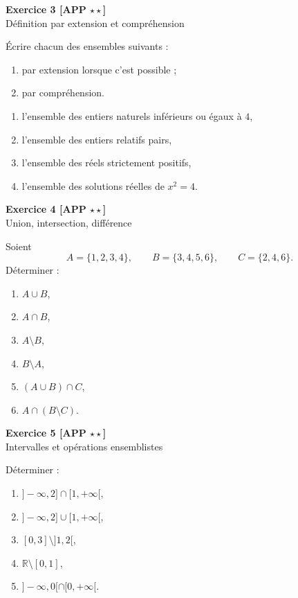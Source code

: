 \documentclass[11pt,a4paper]{article}
\newcommand{\R}{\mathbb{R}}
\begin{document}
\textbf{Exercice 3 [APP \(\star\star\)]}\\
Définition par extension et compréhension

Écrire chacun des ensembles suivants :
\begin{enumerate}[label=\alph*)]
    \item par extension lorsque c’est possible ;
    \item par compréhension.
\end{enumerate}

\begin{enumerate}[label=\arabic*)]
    \item l’ensemble des entiers naturels inférieurs ou égaux à \(4\),
    \item l’ensemble des entiers relatifs pairs,
    \item l’ensemble des réels strictement positifs,
    \item l’ensemble des solutions réelles de \(x^2=4\).
\end{enumerate}

\textbf{Exercice 4 [APP \(\star\star\)]}\\
Union, intersection, différence

Soient
\[
A=\{1,2,3,4\},\qquad B=\{3,4,5,6\},\qquad C=\{2,4,6\}.
\]
Déterminer :
\begin{enumerate}[label=\alph*)]
    \item \(A\cup B\),
    \item \(A\cap B\),
    \item \(A\setminus B\),
    \item \(B\setminus A\),
    \item \((A\cup B)\cap C\),
    \item \(A\cap(B\setminus C)\).
\end{enumerate}

\textbf{Exercice 5 [APP \(\star\star\)]}\\
Intervalles et opérations ensemblistes

Déterminer :
\begin{enumerate}[label=\alph*)]
    \item \(]-\infty,2]\cap [1,+\infty[\),
    \item \(]-\infty,2]\cup [1,+\infty[\),
    \item \([0,3]\setminus ]1,2[\),
    \item \(\R\setminus [0,1]\),
    \item \(]-\infty,0[\cap [0,+\infty[\).
\end{enumerate}
\end{document}
